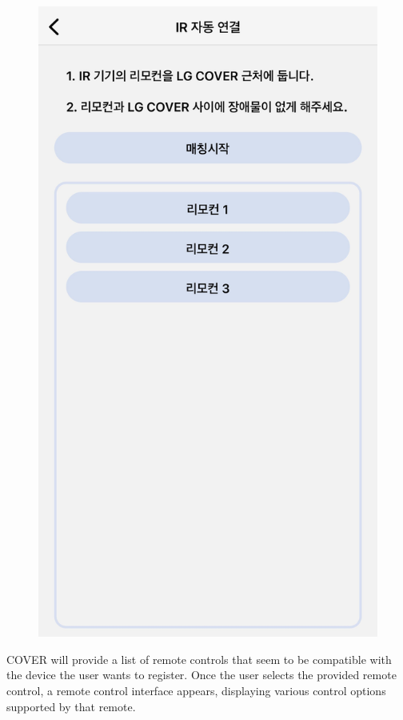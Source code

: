 \documentclass[conference]{IEEEtran}
\begin{document}
\begin{enumerate}[label=\arabic*.]
\begin{enumerate}[label=\alph*.]
\begin{itemize}
\begin{figure}[H]\centering \includegraphics[scale=0.07]{images/sw-spec-16.jpg}\end{figure}
COVER will provide a list of remote controls that seem to be compatible with the device the user wants to register. Once the user selects the provided remote control, a remote control interface appears, displaying various control options supported by that remote.\\

\end{itemize}
\end{enumerate}
\end{enumerate}
\end{document}
